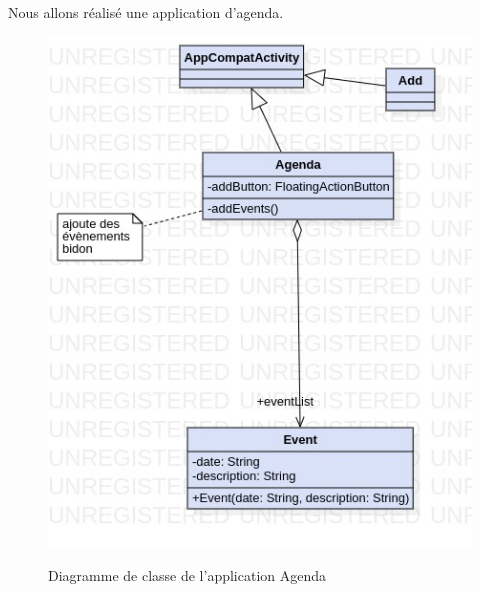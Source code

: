 \documentclass[a4paper]{article}
\begin{document}
\begin{multicols}{2}
    \paragraph{}
      Nous allons réalisé une application d'agenda.
    \begin{figure}
      \centering
      \caption{Diagramme de classe de l'application Agenda}
      \includegraphics[height=\textwidth]{jpg/Model!Agenda_0}
      \label{fig:agendaClass}
    \end{figure}
  \end{multicols}
\end{document}
